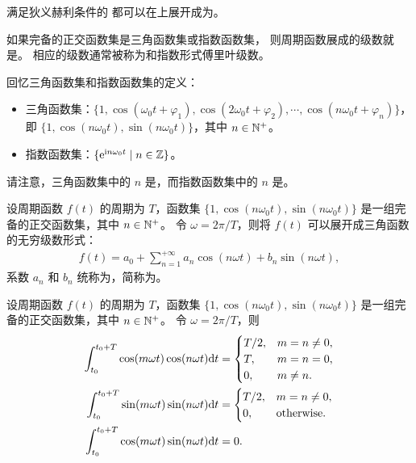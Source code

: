 \begin{property}
    满足狄义赫利条件的
    都可以在上展开成为。
\end{property}

\begin{definition}[傅里叶级数展开]
    如果完备的正交函数集是三角函数集或指数函数集，
    则周期函数展成的级数就是。
    相应的级数通常被称为和{指数形式傅里叶级数}。
\end{definition}

\begin{note}
    回忆三角函数集和指数函数集的定义：
    \begin{itemize}
        \item 三角函数集：$\{1, \cos(\omega_0t + \varphi_1), \cos(2\omega_0t + \varphi_2), \cdots, \cos(n\omega_0 t + \varphi_n)\}$，
            即 $\{1, \cos(n\omega_0t), \sin(n\omega_0t)\}$，其中 $n \in \mathbb{N}^{+}$。
        \item 指数函数集：$\{\mathrm{e}^{\mathrm{i} n\omega_0t} \mid n \in \mathbb{Z}\}$。
    \end{itemize}
    请注意，三角函数集中的 $n$ 是，而指数函数集中的 $n$ 是。
\end{note}

\begin{definition}[三角形式傅里叶级数]
    设周期函数 $f(t)$ 的周期为 $T$，函数集 $\{1, \cos(n\omega_0t), \sin(n\omega_0t)\}$ 是一组完备的正交函数集，其中 $n \in \mathbb{N}^{+}$。
    令 $\omega = 2\pi/T$，则将 $f(t)$ 可以展开成三角函数的无穷级数形式：
    \begin{align*}
        f(t) = a_0 + \sum_{n = 1}^{+\infty}a_n\cos(n\omega t) + b_n\sin(n\omega t),
    \end{align*}
    系数 $a_n$ 和 $b_n$ 统称为，简称为。
\end{definition}

\begin{lemma}
    设周期函数 $f(t)$ 的周期为 $T$，函数集 $\{1, \cos(n\omega_0t), \sin(n\omega_0t)\}$ 是一组完备的正交函数集，其中 $n \in \mathbb{N}^{+}$。
    令 $\omega = 2\pi/T$，则
    \begin{align*}
        \int_{t_0}^{t_0 + T}\cos(m\omega t)\cos (n\omega t)\mathrm{d}t & = \begin{cases}
            T / 2, & m = n \neq 0, \\
            T, & m = n = 0, \\
            0, & m \neq n.
        \end{cases} \\
        \int_{t_0}^{t_0 + T}\sin(m\omega t)\sin (n\omega t)\mathrm{d}t & = \begin{cases}
            T / 2, & m = n \neq 0, \\
            0, & \text{otherwise}.
        \end{cases} \\
        \int_{t_0}^{t_0 + T}\cos(m\omega t)\sin (n\omega t)\mathrm{d}t & = 0.
    \end{align*}
\end{lemma}

